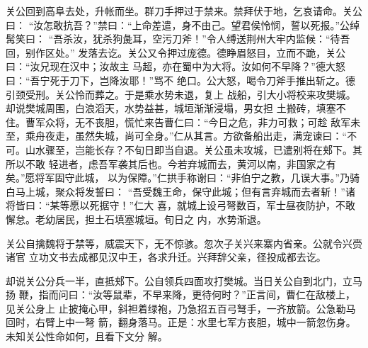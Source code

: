 关公回到高阜去处，升帐而坐。群刀手押过于禁来。禁拜伏于地，乞哀请命。关公曰：
“汝怎敢抗吾？”禁曰：“上命差遣，身不由己。望君侯怜悯，誓以死报。”公绰髯笑曰：
“吾杀汝，犹杀狗彘耳，空污刀斧！”令人缚送荆州大牢内监候：“待吾回，别作区处。”
发落去讫。关公又令押过庞德。德睁眉怒目，立而不跪，关公曰：“汝兄现在汉中；汝故主
马超，亦在蜀中为大将。汝如何不早降？”德大怒曰：“吾宁死于刀下，岂降汝耶！”骂不
绝口。公大怒，喝令刀斧手推出斩之。德引颈受刑。关公怜而葬之。于是乘水势未退，复上
战船，引大小将校来攻樊城。却说樊城周围，白浪滔天，水势益甚，城垣渐渐浸塌，男女担
土搬砖，填塞不住。曹军众将，无不丧胆，慌忙来告曹仁曰：“今日之危，非力可救；可趁
敌军未至，乘舟夜走，虽然失城，尚可全身。”仁从其言。方欲备船出走，满宠谏曰：“不
可。山水骤至，岂能长存？不旬日即当自退。关公虽未攻城，已遣别将在郏下。其所以不敢
轻进者，虑吾军袭其后也。今若弃城而去，黄河以南，非国家之有矣。”愿将军固守此城，
以为保障。”仁拱手称谢曰：“非伯宁之教，几误大事。”乃骑白马上城，聚众将发誓曰：
“吾受魏王命，保守此城；但有言弃城而去者斩！”诸将皆曰：“某等愿以死据守！”仁大
喜，就城上设弓弩数百，军士昼夜防护，不敢懈怠。老幼居民，担土石填塞城垣。旬日之
内，水势渐退。

关公自擒魏将于禁等，威震天下，无不惊骇。忽次子关兴来寨内省亲。公就令兴赍诸官
立功文书去成都见汉中王，各求升迁。兴拜辞父亲，径投成都去讫。

却说关公分兵一半，直抵郏下。公自领兵四面攻打樊城。当日关公自到北门，立马扬
鞭，指而问曰：“汝等鼠辈，不早来降，更待何时？”正言间，曹仁在敌楼上，见关公身上
止披掩心甲，斜袒着绿袍，乃急招五百弓弩手，一齐放箭。公急勒马回时，右臂上中一弩
箭，翻身落马。正是：水里七军方丧胆，城中一箭忽伤身。未知关公性命如何，且看下文分
解。